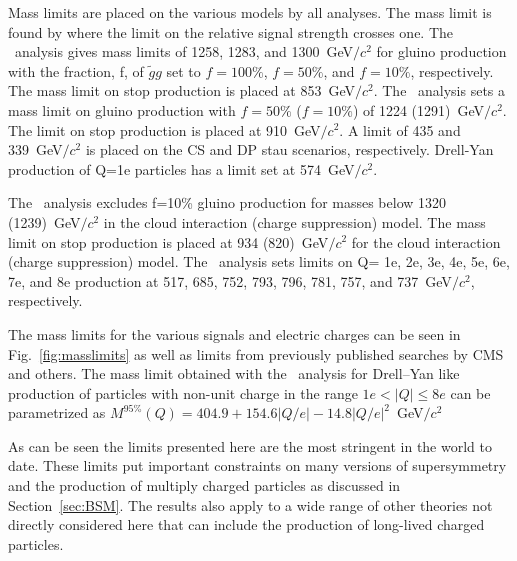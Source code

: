 Mass limits are placed on the various models by all analyses. 
The mass limit is found by where the limit on the relative signal strength crosses one. 
The \muononly\ analysis gives mass limits of 1258, 1283, and 1300~GeV$/c^2$ for gluino production with the fraction, f, of $\tilde{g}g$ set to
$f=100\%$, $f=50\%$, and $f=10\%$, respectively. The mass limit on stop production is placed at 853~GeV$/c^2$. The \tktof\ analysis sets a mass limit on gluino production with
$f=50\%$ ($f=10\%$) of 1224 (1291)~GeV$/c^2$. The limit on stop production is placed at 910~GeV$/c^2$. A limit of 435 and 339~GeV$/c^2$ is placed on the CS 
and DP stau scenarios, respectively. Drell-Yan production of Q=1e particles has a limit set at 574~GeV$/c^2$. 

The \tkonly\ analysis excludes f=10\% gluino production for masses below 1320 (1239)~GeV$/c^2$ in the cloud interaction (charge suppression) model. 
The mass limit on stop production is placed at 934 (820)~GeV$/c^2$ for the cloud interaction (charge suppression) model.
The \multi\ analysis sets limits on Q= 1e, 2e, 3e, 4e, 5e, 6e, 7e, and 8e production at 517, 685, 752, 793, 796, 781, 757, and 737~GeV$/c^2$, respectively.

The mass limits for the various signals and electric charges can be seen in Fig.~\ref{fig:masslimits} as well as limits from previously published searches by CMS and others.
The mass limit obtained with the \multi\ analysis for Drell--Yan like production of
particles  with non-unit charge in the range $1e<|Q|\leq8e$ can be parametrized
 as $M^{95\%}(Q) = 404.9 + 154.6 |Q/e| - 14.8 |Q/e|^2$~GeV$/c^2$

As can be seen the limits presented here are the most stringent in the world to date. These limits put important constraints on many versions of supersymmetry
and the production of multiply charged particles as discussed in Section~\ref{sec:BSM}.
The results also apply to a wide range of other theories not directly considered here that can include the production of long-lived charged particles.


